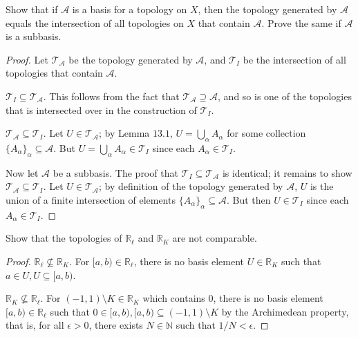 \documentclass[12pt]{article}
\theoremstyle{remark}
\begin{document}
\setcounter{subsubsection}{4}
\begin{problem}
  Show that if $\mathcal{A}$ is a basis for a topology on $X$, then the topology generated by $\mathcal{A}$ equals the intersection of all topologies on $X$ that contain $\mathcal{A}$. Prove the same if $\mathcal{A}$ is a subbasis.
\end{problem}
\begin{proof}
  Let $\mathcal{T}_\mathcal{A}$ be the topology generated by $\mathcal{A}$, and $\mathcal{T}_I$ be the intersection of all topologies that contain $\mathcal{A}$.
  \par $\mathcal{T}_I \subseteq \mathcal{T}_\mathcal{A}$. This follows from the fact that $\mathcal{T}_\mathcal{A} \supseteq \mathcal{A}$, and so is one of the topologies that is intersected over in the construction of $\mathcal{T}_I$.
  \par $\mathcal{T}_\mathcal{A} \subseteq \mathcal{T}_I$. Let $U \in \mathcal{T}_\mathcal{A}$; by Lemma $13.1$, $U = \bigcup_\alpha A_\alpha$ for some collection $\{A_\alpha\}_\alpha \subseteq \mathcal{A}$. But $U = \bigcup_\alpha A_\alpha \in \mathcal{T}_I$ since each $A_\alpha \in \mathcal{T}_I$.
  \par Now let $\mathcal{A}$ be a subbasis. The proof that $\mathcal{T}_I \subseteq \mathcal{T}_\mathcal{A}$ is identical; it remains to show $\mathcal{T}_\mathcal{A} \subseteq \mathcal{T}_I$. Let $U \in \mathcal{T}_\mathcal{A}$; by definition of the topology generated by $\mathcal{A}$, $U$ is the union of a finite intersection of elements $\{A_\alpha\}_\alpha \subseteq \mathcal{A}$. But then $U \in \mathcal{T}_I$ since each $A_\alpha \in \mathcal{T}_I$.
\end{proof}

\begin{problem}
  Show that the topologies of $\mathbb{R}_\ell$ and $\mathbb{R}_K$ are not comparable.
\end{problem}
\begin{proof}
  $\mathbb{R}_\ell \not\subseteq \mathbb{R}_K$. For $[a,b) \in \mathbb{R}_\ell$, there is no basis element $U \in \mathbb{R}_K$ such that $a \in U, U \subseteq [a,b)$. 
  \par $\mathbb{R}_K \not\subseteq \mathbb{R}_\ell$. For $(-1,1) \setminus K \in
  \mathbb{R}_K$ which contains $0$, there is no basis element $[a,b) \in
  \mathbb{R}_\ell$ such that $0 \in [a,b), [a,b) \subseteq (-1,1) \setminus K$
  by the Archimedean property, that is, for all $\epsilon > 0$, there exists $N
  \in \mathbb{N}$ such that $1/N < \epsilon$.
\end{proof}
\end{document}
